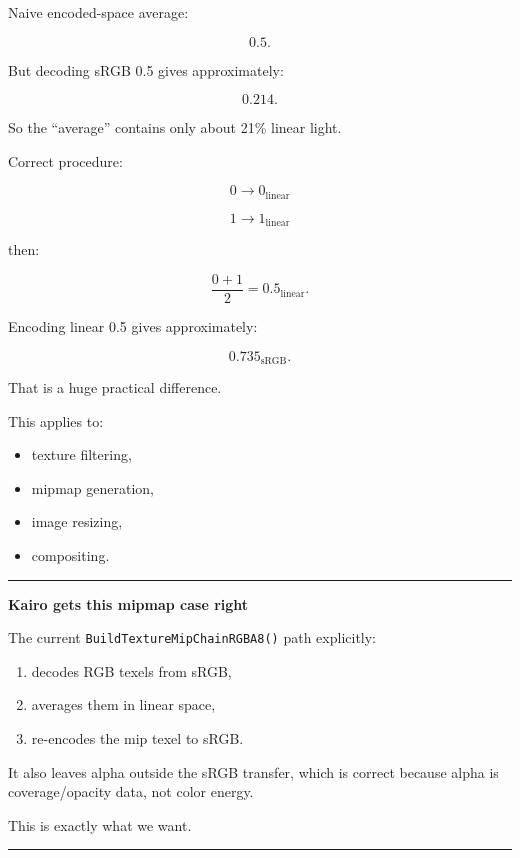 Naive encoded-space average:

\[
0.5.
\]

But decoding sRGB 0.5 gives approximately:

\[
0.214.
\]

So the ``average'' contains only about 21\% linear light.

Correct procedure:

\[
0\rightarrow0_{\text{linear}}
\]

\[
1\rightarrow1_{\text{linear}}
\]

then:

\[
\frac{0+1}{2}=0.5_{\text{linear}}.
\]

Encoding linear 0.5 gives approximately:

\[
\boxed{0.735_{\text{sRGB}}}.
\]

That is a huge practical difference.

This applies to:

\begin{itemize}
\tightlist
\item
  texture filtering,
\item
  mipmap generation,
\item
  image resizing,
\item
  compositing.
\end{itemize}

\begin{center}\rule{0.5\linewidth}{0.5pt}\end{center}

\textbf{Kairo gets this mipmap case right}

The current \texttt{BuildTextureMipChainRGBA8()} path explicitly:

\begin{enumerate}
\def\labelenumi{\arabic{enumi}.}
\tightlist
\item
  decodes RGB texels from sRGB,
\item
  averages them in linear space,
\item
  re-encodes the mip texel to sRGB.
\end{enumerate}

It also leaves alpha outside the sRGB transfer, which is correct because alpha is coverage/opacity data, not color energy.

This is exactly what we want.

\begin{center}\rule{0.5\linewidth}{0.5pt}\end{center}

